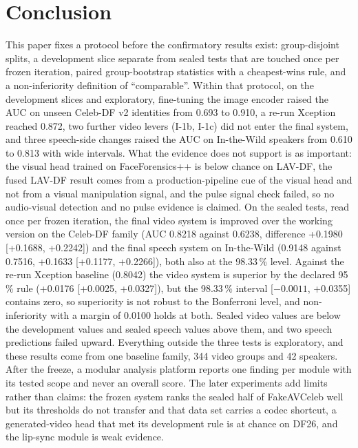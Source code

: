 \documentclass[conference,a4paper]{IEEEtran_nodash}
\begin{document}
\section{Conclusion}\label{sec:concl}
This paper fixes a protocol before the confirmatory results exist: group-disjoint
splits, a development slice separate from sealed tests that are touched once per
frozen iteration, paired group-bootstrap statistics with a cheapest-wins rule,
and a non-inferiority definition of ``comparable''. Within that protocol, on the
development slices and exploratory, fine-tuning the image encoder raised the AUC
on unseen Celeb-DF v2 identities from 0.693 to 0.910, a re-run Xception
reached 0.872, two further video levers (I-1b, I-1c) did not enter the final
system, and three speech-side changes raised the AUC on In-the-Wild
speakers from 0.610 to 0.813 with wide intervals. What the evidence does not
support is as important: the visual head trained on FaceForensics++ is below
chance on LAV-DF, the fused LAV-DF result comes from a production-pipeline cue
of the visual head and not from a visual manipulation signal, and the pulse
signal check failed, so no audio-visual detection and no pulse evidence is
claimed. On the sealed tests, read once per frozen iteration, the final video
system is improved over the working version on the Celeb-DF family (AUC 0.8218
against 0.6238, difference +0.1980 [+0.1688, +0.2242]) and the final speech
system on In-the-Wild (0.9148 against 0.7516, +0.1633 [+0.1177, +0.2266]), both
also at the 98.33\,\% level. Against the re-run Xception baseline (0.8042) the
video system is superior by the declared 95\,\% rule (+0.0176 [+0.0025,
+0.0327]), but the 98.33\,\% interval [$-0.0011$, +0.0355] contains zero, so
superiority is not robust to the Bonferroni level, and non-inferiority with a
margin of 0.0100 holds at both. Sealed video values are below the development
values and sealed speech values above them, and two speech predictions failed
upward. Everything outside the three tests is exploratory, and these results
come from one baseline family, 344 video groups and 42 speakers. %
After the freeze, a modular analysis platform reports one finding per module
with its tested scope and never an overall score. The later experiments add
limits rather than claims: the frozen system ranks the sealed half of
FakeAVCeleb well but its thresholds do not transfer and that data set carries a
codec shortcut, a generated-video head that met its development rule is at
chance on DF26, and the lip-sync module is weak evidence. %



\end{document}
